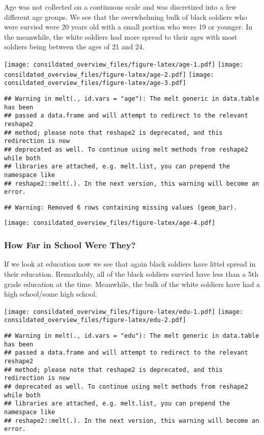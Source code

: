 \documentclass[]{article}
\begin{document}
Age was not collected on a continuous scale and was discretized into a
few different age groups. We see that the overwhelming bulk of black
soldiers who were survied were 20 years old with a small portion who
were 19 or younger. In the meanwhile, the white soldiers had more spread
to their ages with most soldiers being between the ages of 21 and 24.

\texttt{[image: consildated\_overview\_files/figure-latex/age-1.pdf]}
\texttt{[image: consildated\_overview\_files/figure-latex/age-2.pdf]}
\texttt{[image: consildated\_overview\_files/figure-latex/age-3.pdf]}

\begin{verbatim}
## Warning in melt(., id.vars = "age"): The melt generic in data.table has been
## passed a data.frame and will attempt to redirect to the relevant reshape2
## method; please note that reshape2 is deprecated, and this redirection is now
## deprecated as well. To continue using melt methods from reshape2 while both
## libraries are attached, e.g. melt.list, you can prepend the namespace like
## reshape2::melt(.). In the next version, this warning will become an error.
\end{verbatim}

\begin{verbatim}
## Warning: Removed 6 rows containing missing values (geom_bar).
\end{verbatim}

\texttt{[image: consildated\_overview\_files/figure-latex/age-4.pdf]}

\subsubsection{How Far in School Were
They?}\label{how-far-in-school-were-they}

If we look at education now we see that again black soldiers have littel
spread in their education. Remarkably, all of the black soldiers survied
have less than a 5th grade education at the time. Meanwhile, the bulk of
the white soldiers have had a high school/some high school.

\texttt{[image: consildated\_overview\_files/figure-latex/edu-1.pdf]}
\texttt{[image: consildated\_overview\_files/figure-latex/edu-2.pdf]}

\begin{verbatim}
## Warning in melt(., id.vars = "edu"): The melt generic in data.table has been
## passed a data.frame and will attempt to redirect to the relevant reshape2
## method; please note that reshape2 is deprecated, and this redirection is now
## deprecated as well. To continue using melt methods from reshape2 while both
## libraries are attached, e.g. melt.list, you can prepend the namespace like
## reshape2::melt(.). In the next version, this warning will become an error.
\end{verbatim}
\end{document}
